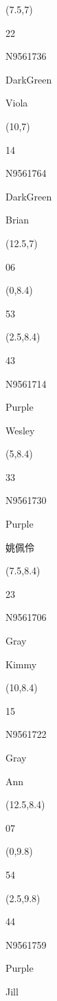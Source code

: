 \documentclass[a4paper]{article}
\newcommand{\myseat}[4]{%
\vspace{-0.1cm}
\parbox[t][2.2cm][t]{3.5cm}{
\small #1 %
\begin{description}
\vspace{-0.1cm}
\item [ID:] #2
\vspace{-0.1cm}
\item [Team:] #3 \normalsize
\vspace{-0.1cm}
\item \normalsize #4
\vspace{-0.1cm}
\end{description}
}
}
\begin{document}
\begin{CJK}{UTF8}{cyberbit}
\begin{textblock}{2.5}(7.5,7)
\myseat{22}{N9561736}{DarkGreen}{Viola}
\end{textblock}

\begin{textblock}{2.5}(10,7)
\myseat{14}{N9561764}{DarkGreen}{Brian}
\end{textblock}

\begin{textblock}{2.5}(12.5,7)
\textblockcolor{}
\myseat{06}{}{}{}
\end{textblock}

\begin{textblock}{2.5}(0,8.4)
\textblockcolor{}
\myseat{53}{}{}{}
\end{textblock}

\begin{textblock}{2.5}(2.5,8.4)
\myseat{43}{N9561714}{Purple}{Wesley}
\end{textblock}

\begin{textblock}{2.5}(5,8.4)
\myseat{33}{N9561730}{Purple}{姚佩伶}
\end{textblock}

\begin{textblock}{2.5}(7.5,8.4)
\myseat{23}{N9561706}{Gray}{Kimmy}
\end{textblock}

\begin{textblock}{2.5}(10,8.4)
\myseat{15}{N9561722}{Gray}{Ann}
\end{textblock}

\begin{textblock}{2.5}(12.5,8.4)
\textblockcolor{}
\myseat{07}{}{}{}
\end{textblock}

\begin{textblock}{2.5}(0,9.8)
\textblockcolor{}
\myseat{54}{}{}{}
\end{textblock}

\begin{textblock}{2.5}(2.5,9.8)
\myseat{44}{N9561759}{Purple}{Jill}
\end{textblock}


\end{CJK}
\end{document}
